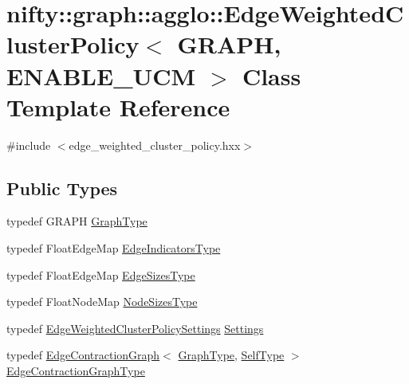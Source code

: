 \hypertarget{classnifty_1_1graph_1_1agglo_1_1EdgeWeightedClusterPolicy}{}\section{nifty\+:\+:graph\+:\+:agglo\+:\+:Edge\+Weighted\+Cluster\+Policy$<$ G\+R\+A\+P\+H, E\+N\+A\+B\+L\+E\+\_\+\+U\+C\+M $>$ Class Template Reference}
\label{classnifty_1_1graph_1_1agglo_1_1EdgeWeightedClusterPolicy}


{\ttfamily \#include $<$edge\+\_\+weighted\+\_\+cluster\+\_\+policy.\+hxx$>$}

\subsection*{Public Types}
\begin{DoxyCompactItemize}
\item 
typedef G\+R\+A\+P\+H \hyperlink{classnifty_1_1graph_1_1agglo_1_1EdgeWeightedClusterPolicy_a8e910f7b9d0c1baa1de7b6b1c3e58397}{Graph\+Type}
\item 
typedef Float\+Edge\+Map \hyperlink{classnifty_1_1graph_1_1agglo_1_1EdgeWeightedClusterPolicy_a1b8107133a86be855885f1910652b0af}{Edge\+Indicators\+Type}
\item 
typedef Float\+Edge\+Map \hyperlink{classnifty_1_1graph_1_1agglo_1_1EdgeWeightedClusterPolicy_a64d646cc14e503e9a76a4646234d9754}{Edge\+Sizes\+Type}
\item 
typedef Float\+Node\+Map \hyperlink{classnifty_1_1graph_1_1agglo_1_1EdgeWeightedClusterPolicy_a44ba54059efcb57c8c8091016fb9ee99}{Node\+Sizes\+Type}
\item 
typedef \hyperlink{structnifty_1_1graph_1_1agglo_1_1EdgeWeightedClusterPolicySettings}{Edge\+Weighted\+Cluster\+Policy\+Settings} \hyperlink{classnifty_1_1graph_1_1agglo_1_1EdgeWeightedClusterPolicy_acb5f307af4f968aac09e0aa716df633a}{Settings}
\item 
typedef \hyperlink{classnifty_1_1graph_1_1EdgeContractionGraph}{Edge\+Contraction\+Graph}$<$ \hyperlink{classnifty_1_1graph_1_1agglo_1_1EdgeWeightedClusterPolicy_a8e910f7b9d0c1baa1de7b6b1c3e58397}{Graph\+Type}, \hyperlink{classnifty_1_1graph_1_1agglo_1_1EdgeWeightedClusterPolicy}{Self\+Type} $>$ \hyperlink{classnifty_1_1graph_1_1agglo_1_1EdgeWeightedClusterPolicy_af2c3024ed1be514c58004dfa7e77448b}{Edge\+Contraction\+Graph\+Type}
\end{DoxyCompactItemize}
